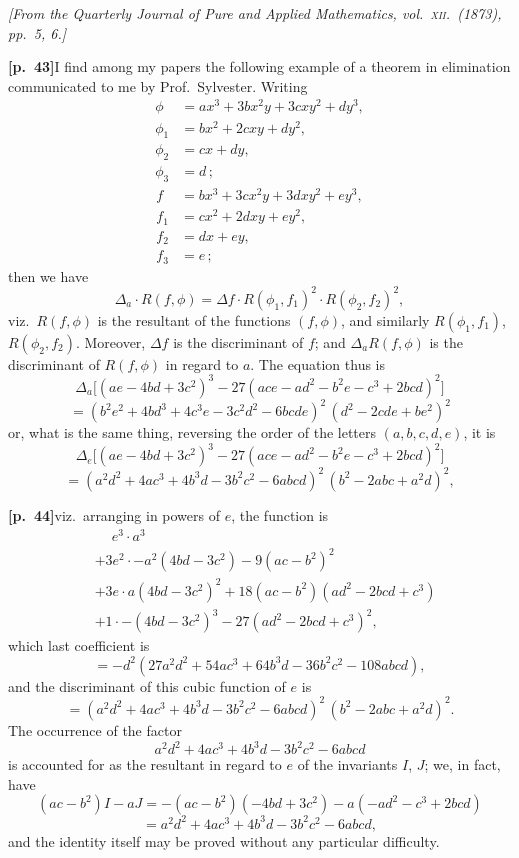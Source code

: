 \documentclass[11pt,a4paper]{article}
\begin{document}
\noindent\textit{[From the Quarterly Journal of Pure and Applied Mathematics, vol.\ \textsc{xii}.\ (1873), pp.~5, 6.]}

\bigskip

\noindent\textbf{[p.~43]}\quad I find among my papers the following example of a theorem in elimination communicated to me by Prof.\ Sylvester. Writing
\begin{align*}
\phi &= ax^{3} + 3bx^{2}y + 3cxy^{2} + dy^{3}, \\
\phi_{1} &= bx^{2} + 2cxy + dy^{2}, \\
\phi_{2} &= cx + dy, \\
\phi_{3} &= d\,;
\end{align*}
\begin{align*}
f &= bx^{3} + 3cx^{2}y + 3dxy^{2} + ey^{3}, \\
f_{1} &= cx^{2} + 2dxy + ey^{2}, \\
f_{2} &= dx + ey, \\
f_{3} &= e\,;
\end{align*}
then we have
\[
\Delta_{a}\cdot R(f, \phi) = \Delta f \cdot R(\phi_{1}, f_{1})^{2}\cdot R(\phi_{2}, f_{2})^{2},
\]
viz.\ $R(f, \phi)$ is the resultant of the functions $(f, \phi)$, and similarly $R(\phi_{1}, f_{1})$, $R(\phi_{2}, f_{2})$. Moreover, $\Delta f$ is the discriminant of $f$; and $\Delta_{a}R(f, \phi)$ is the discriminant of $R(f, \phi)$ in regard to $a$. The equation thus is
\[
\Delta_{a}\bigl[(ae - 4bd + 3c^{2})^{3} - 27(ace - ad^{2} - b^{2}e - c^{3} + 2bcd)^{2}\bigr]
\]
\[
= (b^{2}e^{2} + 4bd^{3} + 4c^{3}e - 3c^{2}d^{2} - 6bcde)^{2}\,(d^{2} - 2cde + be^{2})^{2}
\]
or, what is the same thing, reversing the order of the letters $(a, b, c, d, e)$, it is
\[
\Delta_{e}\bigl[(ae - 4bd + 3c^{2})^{3} - 27(ace - ad^{2} - b^{2}e - c^{3} + 2bcd)^{2}\bigr]
\]
\[
= (a^{2}d^{2} + 4ac^{3} + 4b^{3}d - 3b^{2}c^{2} - 6abcd)^{2}\,(b^{2} - 2abc + a^{2}d)^{2},
\]

\bigskip

\noindent\textbf{[p.~44]}\quad viz.\ arranging in powers of $e$, the function is
\begin{align*}
&\phantom{+}e^{3}\cdot a^{3} \\
&+ 3e^{2}\cdot -a^{2}(4bd - 3c^{2}) - 9(ac - b^{2})^{2} \\
&+ 3e\cdot a(4bd - 3c^{2})^{2} + 18(ac - b^{2})(ad^{2} - 2bcd + c^{3}) \\
&+ 1\cdot -(4bd - 3c^{2})^{3} - 27(ad^{2} - 2bcd + c^{3})^{2},
\end{align*}
which last coefficient is
\[
= -d^{2}(27a^{2}d^{2} + 54ac^{3} + 64b^{3}d - 36b^{2}c^{2} - 108abcd),
\]
and the discriminant of this cubic function of $e$ is
\[
= (a^{2}d^{2} + 4ac^{3} + 4b^{3}d - 3b^{2}c^{2} - 6abcd)^{2}\,(b^{2} - 2abc + a^{2}d)^{2}.
\]
The occurrence of the factor
\[
a^{2}d^{2} + 4ac^{3} + 4b^{3}d - 3b^{2}c^{2} - 6abcd
\]
is accounted for as the resultant in regard to $e$ of the invariants $I$, $J$; we, in fact, have
\[
(ac - b^{2})I - aJ = -(ac - b^{2})(-4bd + 3c^{2}) - a(-ad^{2} - c^{3} + 2bcd)
\]
\[
= a^{2}d^{2} + 4ac^{3} + 4b^{3}d - 3b^{2}c^{2} - 6abcd,
\]
and the identity itself may be proved without any particular difficulty.
\end{document}
